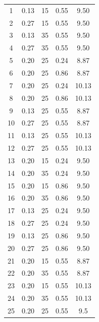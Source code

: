 \begin{table}[H]
\begin{tabular*}{\textwidth}{@{\extracolsep{\stretch{1}}}*{5}{c}@{}}
1         & 0.13 & 15   & 0.55 & 9.50  \\
2         & 0.27 & 15   & 0.55 & 9.50  \\
3         & 0.13 & 35   & 0.55 & 9.50  \\
4                                 & 0.27                         & 35   & 0.55 & 9.50  \\
5                                 & 0.20                         & 25   & 0.24 & 8.87  \\
6                                 & 0.20                         & 25   & 0.86 & 8.87  \\
7                                 & 0.20                         & 25   & 0.24 & 10.13 \\
8                                 & 0.20                         & 25   & 0.86 & 10.13 \\
9                                 & 0.13                         & 25   & 0.55 & 8.87  \\
10                                & 0.27                         & 25   & 0.55 & 8.87  \\
11                                & 0.13                         & 25   & 0.55 & 10.13 \\
12                                & 0.27                         & 25   & 0.55 & 10.13 \\
13                                & 0.20                         & 15   & 0.24 & 9.50  \\
14                                & 0.20                         & 35   & 0.24 & 9.50  \\
15                                & 0.20                         & 15   & 0.86 & 9.50  \\
16                                & 0.20                         & 35   & 0.86 & 9.50  \\
17                                & 0.13                         & 25   & 0.24 & 9.50  \\
18                                & 0.27                         & 25   & 0.24 & 9.50  \\
19                                & 0.13                         & 25   & 0.86 & 9.50  \\
20                                & 0.27                         & 25   & 0.86 & 9.50  \\
21                                & 0.20                         & 15   & 0.55 & 8.87  \\
22                                & 0.20                         & 35   & 0.55 & 8.87  \\
23                                & 0.20                         & 15   & 0.55 & 10.13 \\
24                                & 0.20                         & 35   & 0.55 & 10.13 \\
25                                & 0.20                         & 25   & 0.55 & 9.5  \\


\end{tabular*}
\end{table}
